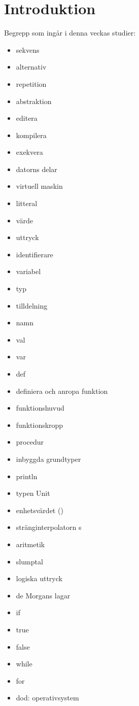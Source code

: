 \chapter{Introduktion}\label{chapter:W01}
Begrepp som ingår i denna veckas studier:
\begin{multicols}{2}\begin{itemize}[noitemsep,label={$\square$},leftmargin=*]
\item sekvens
\item alternativ
\item repetition
\item abstraktion
\item editera
\item kompilera
\item exekvera
\item datorns delar
\item virtuell maskin
\item litteral
\item värde
\item uttryck
\item identifierare
\item variabel
\item typ
\item tilldelning
\item namn
\item val
\item var
\item def
\item definiera och anropa funktion
\item funktionshuvud
\item funktionskropp
\item procedur
\item inbyggda grundtyper
\item println
\item typen Unit
\item enhetsvärdet ()
\item stränginterpolatorn s
\item aritmetik
\item slumptal
\item logiska uttryck
\item de Morgans lagar
\item if
\item true
\item false
\item while
\item for
\item dod: operativsystem\end{itemize}\end{multicols}
